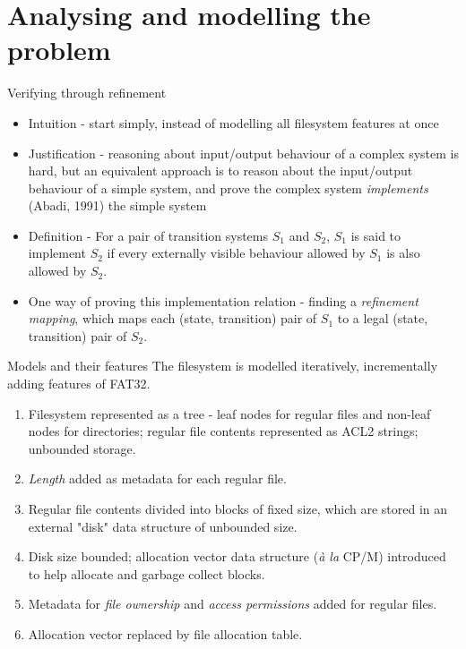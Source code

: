 \documentclass{beamer}
\begin{document}
\section{Analysing and modelling the problem}

\begin{frame}{Verifying through refinement}
  \begin{itemize}
  \item Intuition - start simply, instead of modelling all
    filesystem features at once
  \item Justification - reasoning about input/output behaviour of a
    complex system is hard, but an equivalent approach is to reason
    about the input/output behaviour of a simple system, and prove the
    complex system \textit{implements} (Abadi, 1991) the simple system
  \item Definition - For a pair of transition systems $S_1$ and $S_2$,
    $S_1$ is said to implement $S_2$ if every externally visible
    behaviour allowed by $S_1$ is also allowed by $S_2$.
  \item One way of proving this implementation relation - finding a
    \textit{refinement mapping}, which maps each
    (state, transition) pair of $S_1$ to a legal (state, transition)
    pair of $S_2$.
  \end{itemize}
\end{frame}

\begin{frame}{Models and their features}
  The filesystem is modelled iteratively, incrementally
    adding features of FAT32.
  \begin{enumerate}
  \item Filesystem represented as a tree - leaf
    nodes for regular files and non-leaf nodes for
    directories; regular file contents represented as ACL2
    strings; unbounded storage.
  \item \textit{Length} added as metadata for each regular file.
  \item Regular file contents divided into
    blocks of fixed size, which are stored in an external
    "disk" data structure of unbounded size.
  \item Disk size bounded; allocation vector data structure
    (\textit{\`{a} la} CP/M) introduced to help allocate and garbage
    collect blocks.
  \item Metadata for \textit{file ownership} and \textit{access
    permissions} added for regular files.
  \item Allocation vector replaced by file allocation table.
  \end{enumerate}
\end{frame}
\end{document}

